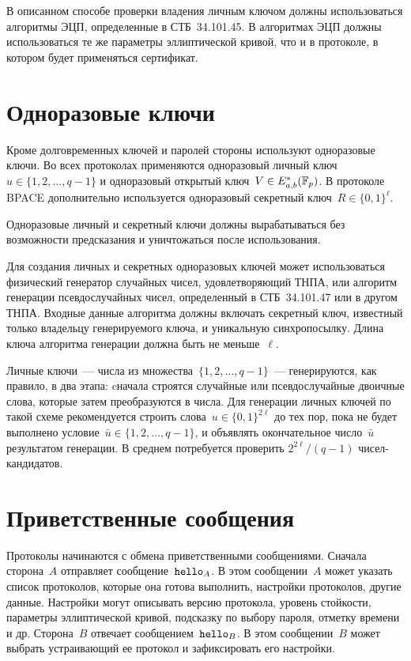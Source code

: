 В описанном способе проверки владения личным ключом должны использоваться
алгоритмы ЭЦП, определенные в СТБ~34.101.45. В алгоритмах ЭЦП должны
использоваться те же параметры эллиптической кривой, что и в протоколе, в
котором будет применяться сертификат.

\section{Одноразовые ключи}\label{COMMON.Ephemeral}

Кроме долговременных ключей и паролей стороны используют одноразовые ключи. Во
всех протоколах применяются одноразовый личный ключ~$u\in\{1,2,\ldots,q-1\}$ и
одноразовый открытый ключ~$V\in E_{a,b}^*(\mathbb{F}_p)$. В протоколе BPACE
дополнительно используется одноразовый секретный ключ~$R\in\{0,1\}^\ell$.

Одноразовые личный и секретный ключи должны вырабатываться без возможности
предсказания и уничтожаться после использования.

Для создания личных и секретных одноразовых ключей может использоваться
физический генератор случайных чисел, удовлетворяющий ТНПА, или алгоритм
генерации псевдослучайных чисел, определенный в СТБ~34.101.47 или в другом ТНПА.
Входные данные алгоритма должны включать секретный ключ, известный только
владельцу генерируемого ключа, и уникальную синхропосылку. Длина ключа алгоритма
генерации должна быть не меньше~$\ell$.

\begin{note*}
Личные ключи~--- числа из множества~$\{1,2,\ldots,q-1\}$~--- 
генерируются, как правило, в два этапа: cначала строятся случайные 
или псевдослучайные двоичные слова, которые затем преобразуются в числа. 
Для генерации личных ключей по такой схеме 
рекомендуется строить слова~$u\in\{0,1\}^{2\ell}$ до тех пор, 
пока не будет выполнено условие~$\bar{u}\in\{1,2,\ldots,q-1\}$,
и объявлять окончательное число~$\bar{u}$ результатом генерации.
В среднем потребуется проверить $2^{2\ell}/(q-1)$ чисел-кандидатов.
\end{note*}

\section{Приветственные сообщения}\label{COMMON.Hello}

Протоколы начинаются с обмена приветственными сообщениями.
Сначала сторона~$A$ отправляет сообщение~$\texttt{hello}_A$.
%
В этом сообщении~$A$ может указать список протоколов, которые она готова
выполнить, настройки протоколов, другие данные. Настройки могут описывать версию
протокола, уровень стойкости, параметры эллиптической кривой, подсказку по
выбору пароля, отметку времени и др.
%
Сторона~$B$ отвечает сообщением~$\texttt{hello}_B$.
%
В этом сообщении~$B$ может выбрать устраивающий ее протокол и зафиксировать его
настройки.

